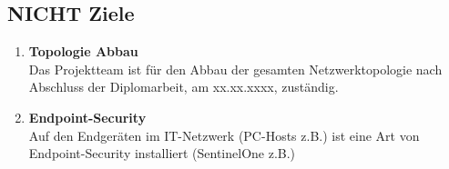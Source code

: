 \documentclass[
	headings=optiontotocandhead,%
	oneside,
	numbers=noenddot,%
	toc=flat, %
	10pt, %
	parskip=full, %
	listof=totoc, %
	listof=flat, %
	numbers=noenddot, %
	bibliography=totoc, %
	a4paper,DIV=14,
]{scrartcl}
\begin{document}
\subsection{NICHT Ziele}
\begin{enumerate}[start=1,label={\bfseries Ziel-N \arabic*},leftmargin=*,wide]
\item{\bfseries{Topologie Abbau}}\\
Das Projektteam ist für den Abbau der gesamten Netzwerktopologie nach Abschluss der Diplomarbeit, am xx.xx.xxxx, zuständig.
\item{\bfseries{Endpoint-Security}}\\
Auf den Endgeräten im IT-Netzwerk (PC-Hosts z.B.) ist eine Art von Endpoint-Security installiert (SentinelOne z.B.)
\end{enumerate}
\end{document}
